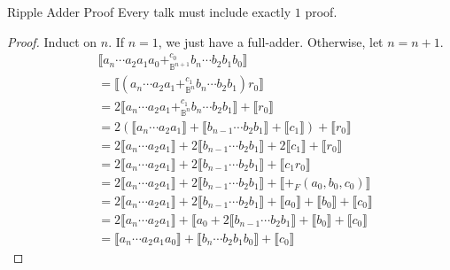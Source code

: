 \documentclass[aspectratio=169]{beamer}
\begin{document}
\begin{frame}{Ripple Adder Proof}
Every talk must include exactly $1$ proof.

\begin{proof}
  Induct on $n$. If $n=1$, we just have a full-adder. Otherwise, let $n = n + 1$.
  \begin{align}
    &\llbracket a_{n}\cdots a_{2}a_{1}a_{0} +_{\mathbb{B}^{n+1}}^{c_{0}} b_{n} \cdots b_{2}b_{1}b_{0} \rrbracket\\
    &= \llbracket (a_{n} \cdots a_{2}a_{1} +_{\mathbb{B}^{n}}^{c_{1}} b_{n} \cdots b_{2}b_{1})  r_{0}  \rrbracket \\
    &= 2\llbracket a_{n} \cdots a_{2}a_{1} +_{\mathbb{B}^{n}}^{c_{1}} b_{n} \cdots b_{2}b_{1} \rrbracket + \llbracket  r_{0}  \rrbracket \\
    &= 2 (\llbracket a_{n} \cdots a_{2}a_{1} \rrbracket  +  \llbracket b_{n-1} \cdots b_{2}b_{1} \rrbracket + \llbracket c_{1} \rrbracket ) + \llbracket  r_{0}  \rrbracket \\
    &= 2 \llbracket a_{n} \cdots a_{2}a_{1} \rrbracket  +  2\llbracket b_{n-1} \cdots b_{2}b_{1} \rrbracket + 2\llbracket c_{1} \rrbracket + \llbracket r_{0} \rrbracket \\
    &= 2 \llbracket a_{n} \cdots a_{2}a_{1} \rrbracket  +  2\llbracket b_{n-1} \cdots b_{2}b_{1} \rrbracket + \llbracket c_{1}r_{0} \rrbracket \\
    &= 2 \llbracket a_{n} \cdots a_{2}a_{1} \rrbracket  +  2\llbracket b_{n-1} \cdots b_{2}b_{1} \rrbracket + \llbracket +_{F}(a_{0}, b_{0}, c_{0}) \rrbracket \\
    &= 2 \llbracket a_{n} \cdots a_{2}a_{1} \rrbracket  +  2\llbracket b_{n-1} \cdots b_{2}b_{1} \rrbracket + \llbracket a_{0} \rrbracket + \llbracket b_{0}\rrbracket + \llbracket c_{0} \rrbracket \\
    &= 2 \llbracket a_{n} \cdots a_{2}a_{1} \rrbracket + \llbracket a_{0}  +  2\llbracket b_{n-1} \cdots b_{2}b_{1} \rrbracket + \llbracket b_{0} \rrbracket  + \llbracket c_{0} \rrbracket \\
    &= \llbracket a_{n} \cdots a_{2}a_{1}a_{0} \rrbracket + \llbracket b_{n} \cdots b_{2}b_{1}b_{0} \rrbracket + \llbracket c_{0} \rrbracket
\end{align}
\end{proof}
\end{frame}
\end{document}

